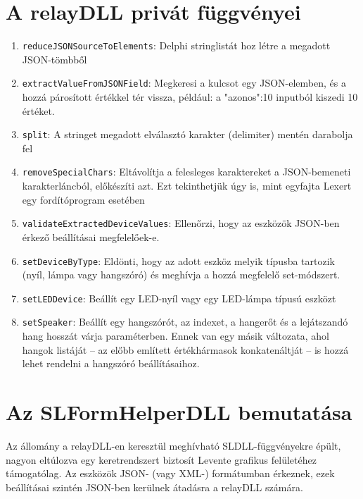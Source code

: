 \documentclass[tocnopagenum]{thesis-ekf}
\begin{document}
	\section{A relayDLL privát függvényei}
	\begin{enumerate}
  		\item \verb*|reduceJSONSourceToElements|: Delphi stringlistát hoz létre a megadott JSON-tömbből
		\item \verb*|extractValueFromJSONField|:  Megkeresi a kulcsot egy JSON-elemben, és a hozzá párosított értékkel tér vissza, például: a "azonos":10 inputból kiszedi 10 értéket.
		\item \verb*|split|: A stringet megadott elválasztó karakter (delimiter) mentén darabolja fel
		\item \verb*|removeSpecialChars|: Eltávolítja a felesleges karaktereket a JSON-bemeneti karakterláncból, előkészíti azt. Ezt tekinthetjük úgy is, mint egyfajta Lexert egy fordítóprogram esetében
		\item \verb*|validateExtractedDeviceValues|: Ellenőrzi, hogy az eszközök JSON-ben érkező beállításai megfelelőek-e.
		\item \verb*|setDeviceByType|: Eldönti, hogy az adott eszköz melyik típusba tartozik (nyíl, lámpa vagy hangszóró) és meghívja a hozzá megfelelő set-módszert.
		\item \verb*|setLEDDevice|: Beállít egy LED-nyíl vagy egy LED-lámpa típusú eszközt
		\item \verb*|setSpeaker|: Beállít egy hangszórót, az indexet, a hangerőt és a lejátszandó hang hosszát várja paraméterben. Ennek van egy másik változata, ahol hangok listáját -- az előbb említett értékhármasok konkatenáltját -- is hozzá lehet rendelni a hangszóró beállításaihoz.
	\end{enumerate}

	
	\section{Az SLFormHelperDLL bemutatása}
	Az állomány a relayDLL-en keresztül meghívható SLDLL-függvényekre épült, nagyon eltúlozva egy keretrendszert biztosít Levente grafikus felületéhez támogatólag. Az eszközök JSON- (vagy XML-) formátumban érkeznek, ezek beállításai szintén JSON-ben kerülnek átadásra a relayDLL számára.
	
\end{document}
